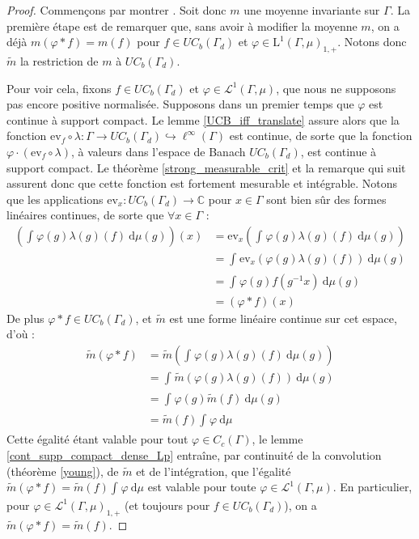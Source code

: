 \documentclass[a4paper,12pt]{article}
\newcommand{\C}{\mathbb{C}}
\newcommand{\ev}{\mathrm{ev}}
\newcommand{\integral}[4]{\int_{#1}^{#2} #3~\mathrm{d}#4}
\newcommand{\inv}{^{-1}}
\newcommand{\comp}{\circ}
\renewcommand{\implies}{\Rightarrow}
\begin{document}
\begin{proof}
    Commençons par montrer \framebox{$(\ref{amenable_TFAE/amenable})\implies(\ref{amenable_TFAE/topological_mean})$}. Soit donc 
    $m$ une moyenne invariante sur $\Gamma$. La première étape est de remarquer que, sans avoir à modifier la moyenne 
    $m$, on a déjà $m(\varphi\ast f) = m(f)$ pour $f\in UC_b(\Gamma_d)$ et $\varphi\in\mathrm{L}^1(\Gamma, \mu)_{1, +}$.
    Notons donc $\widetilde{m}$ la restriction de $m$ à $UC_b(\Gamma_d)$.

    Pour voir cela, fixons $f\in UC_b(\Gamma_d)$ et $\varphi\in\mathscr{L}^1(\Gamma, \mu)$, que nous ne supposons pas encore positive normalisée.
    Supposons dans un premier temps que $\varphi$ est continue à support compact. Le lemme \ref{UCB_iff_translate} assure 
    alors que la fonction $\ev_f\comp\lambda:\Gamma\to UC_b(\Gamma_d)\hookrightarrow\ell^\infty(\Gamma)$ est continue,
    de sorte que la fonction $\varphi\cdot(\ev_f\comp\lambda)$, à valeurs dans l'espace de Banach $UC_b(\Gamma_d)$, est continue à support compact.
    Le théorème \ref{strong_measurable_crit} et la remarque qui suit assurent donc que cette fonction est fortement mesurable et intégrable.
    Notons que les applications $\ev_x:UC_b(\Gamma_d)\to\C$ pour $x\in\Gamma$ sont bien sûr des formes linéaires continues, de sorte que $\forall x\in\Gamma$ :
    \begin{align*}
        \left(\integral{}{}{\varphi(g)\lambda(g)(f)}{\mu(g)}\right)(x) 
            &= \ev_x\left(\integral{}{}{\varphi(g)\lambda(g)(f)}{\mu(g)}\right) \\
            &= \integral{}{}{\ev_x(\varphi(g)\lambda(g)(f))}{\mu(g)} \\
            &= \integral{}{}{\varphi(g)f(g\inv x)}{\mu(g)} \\
            &= (\varphi\ast f)(x)
    \end{align*}
    De plus $\varphi\ast f\in UC_b(\Gamma_d)$, et $\widetilde{m}$ est une forme linéaire continue sur cet espace, d'où :
    \begin{align*}
        \widetilde{m}(\varphi\ast f) 
            &= \widetilde{m}\left(\integral{}{}{\varphi(g)\lambda(g)(f)}{\mu(g)}\right) \\
            &= \integral{}{}{\widetilde{m}(\varphi(g)\lambda(g)(f))}{\mu(g)} \\
            &= \integral{}{}{\varphi(g)\widetilde{m}(f)}{\mu(g)} \\
            &= \widetilde{m}(f)\integral{}{}{\varphi}{\mu}
    \end{align*}
    Cette égalité étant valable pour tout $\varphi\in C_c(\Gamma)$, le lemme \ref{cont_supp_compact_dense_Lp} entraîne, par continuité de la convolution (théorème \ref{young}),
    de $\widetilde{m}$ et de l'intégration, que l'égalité $\widetilde{m}(\varphi\ast f) = \widetilde{m}(f)\integral{}{}{\varphi}{\mu}$ est valable 
    pour toute $\varphi\in\mathscr{L}^1(\Gamma, \mu)$. En particulier, pour $\varphi\in\mathscr{L}^1(\Gamma, \mu)_{1, +}$ (et toujours pour 
    $f\in UC_b(\Gamma_d)$), on a $\widetilde{m}(\varphi\ast f) = \widetilde{m}(f)$.
    

\end{proof}
\end{document}
